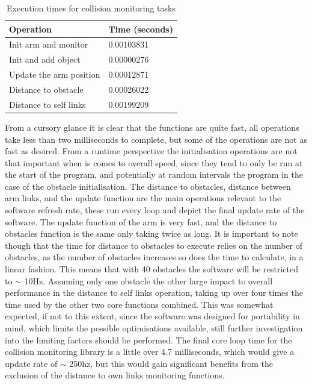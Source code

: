 \documentclass[a4paper, 11.5pt, conference]{ieeeconf}      %
\begin{document}
\begin{table}[H]
	\centering
	\begin{tabular}{|l|l|}
		\hline
		Operation & Time (seconds) \\ \hline
		Init arm and monitor   & 0.00103831     \\ \hline
		Init and add object    & 0.00000276     \\ \hline
		Update the arm position& 0.00012871     \\ \hline
		Distance to obstacle   & 0.00026022     \\ \hline
		Distance to self links & 0.00199209     \\ \hline
	\end{tabular}
	\caption{Execution times for collision monitoring tasks}
	\label{table:Function Times}
\end{table}
From a cursory glance it is clear that the functions are quite fast, all operations take less than two milliseconds to complete, but some of the operations are not as fast as desired. From a runtime perspective the initialisation operations are not that important when is comes to overall speed, since they tend to only be run at the start of the program, and potentially at random intervals the program in the case of the obstacle initialisation. The distance to obstacles, distance between arm links, and the update function are the main operations relevant to the software refresh rate, these run every loop and depict the final update rate of the software. The update function of the arm is very fast, and the distance to obstacles function is the same only taking twice as long. It is important to note though that the time for distance to obstacles to execute relies on the number of obstacles, as the number of obstacles increases so does the time to calculate, in a linear fashion. This means that with 40 obstacles the software will be restricted to $\sim$ 10Hz. Assuming only one obstacle the other large impact to overall performance in the distance to self links operation, taking up over four times the time used by the other two core functions combined. This was somewhat expected, if not to this extent, since the software was designed for portability in mind, which limits the possible optimisations available, still further investigation into the limiting factors should be performed. The final core loop time for the collision monitoring library is a little over 4.7 milliseconds, which would give a update rate of $\sim$ 250hz, but this would gain significant benefits from the exclusion of the distance to own links monitoring functions.
\end{document}
